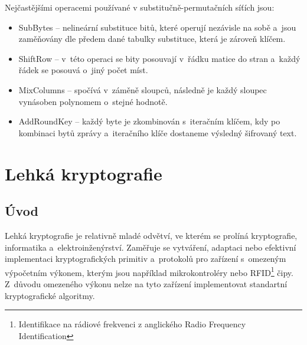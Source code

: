 Nejčastějšími operacemi používané v substitučně-permutačních síťích jsou:
\begin{itemize}
    \item SubBytes -- nelineární substituce bitů, které operují nezávisle na sobě a~jsou zaměňovány dle předem dané tabulky substituce, která je zároveň klíčem. 
    \item ShiftRow -- v~této operaci se bity posouvají v~řádku matice do stran a~každý řádek se posouvá o~jiný počet míst.
    \item MixColumns -- spočívá v~záměně sloupců, následně je každý sloupec vynásoben polynomem o~stejné hodnotě.
    \item AddRoundKey -- každý byte je zkombinován s~iteračním klíčem, kdy po kombinaci bytů zprávy a~iteračního klíče dostaneme výsledný šifrovaný text. 
\end{itemize}%
\null
\vfill

\chapter{Lehká kryptografie}
\section{Úvod}
Lehká kryptografie je relativně mladé odvětví, ve kterém se prolíná kryptografie, informatika  a~elektroinženýrství. Zaměřuje se vytváření, adaptaci nebo efektivní implementaci kryptografických primitiv a~protokolů pro zařízení s~omezeným výpočetním výkonem, kterým jsou například mikrokontroléry nebo RFID\footnote{Identifikace na rádiové frekvenci z anglického Radio Frequency Identification} čipy. Z~důvodu omezeného výkonu nelze na tyto zařízení implementovat standartní kryptografické algoritmy.\cite{PoschmannCrypto}

